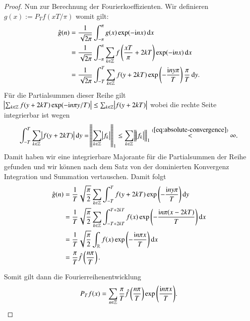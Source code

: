 \begin{proof}
  Nun zur Berechnung der Fourierkoeffizienten. Wir definieren $g(x):=P_T f(xT/\pi)$ womit gilt:
  \begin{equation*}
    \begin{split}
      \fouriertransform{g}(n)
      & =\frac{1}{\sqrt{2\pi}} \int_{-\pi}^\pi{g(x)\exp(-\i nx) \dif x} \\
      & =\frac{1}{\sqrt{2\pi}} \int_{-\pi}^\pi{\sum_{k \in \Z}{f \left( \frac{xT}{\pi} + 2kT \right)} \exp(-\i nx) \dif x} \\
      &= \frac{1}{\sqrt{2\pi}} \int_{-T}^T{\sum_{k \in \Z}{f(y + 2kT)} \exp \left( -\frac{\i ny\pi}{T} \right) \frac{\pi}{T} \dif y}.
    \end{split}
  \end{equation*}
  Für die Partialsummen dieser Reihe gilt $\abs{\sum_{k \in \mathbb{Z}}{f(y+2kT) \exp (-\mathrm{i} n\pi y/T)}} \leq \sum_{k \in \mathbb{Z}}{\abs{f(y+2kT)}}$ wobei die rechte Seite integrierbar ist wegen
  \begin{equation*}
    \int_{-T}^{T}{\sum_{k \in \Z}{\abs{f(y+2kT)}} \dif y}
    = \norm{\sum_{k \in \Z}{\abs{f_k}}}_1
    \leq \sum_{k \in \Z}{\norm{\abs{f_k}}_1}
    \stackrel{(\ref{eq:absolute-convergence})}{<} \infty.
  \end{equation*}
  Damit haben wir eine integrierbare Majorante für die Partialsummen der Reihe gefunden und wir können nach dem Satz von der dominierten Konvergenz Integration und Summation vertauschen. Damit folgt
  \begin{equation*}
    \begin{split}
      \fouriertransform{g}(n)
      &=\frac{1}{T}\sqrt{\frac{\pi}{2}} \sum_{k \in \Z}{\int_{-T}^T{f(y+2kT) \exp \left( - \frac{\i ny\pi}{T} \right) \dif y}} \\
      &=\frac{1}{T} \sqrt{\frac{\pi}{2}} \sum_{k \in \Z}{\int_{-T+2kT}^{T+2kT}{f(x)\exp \left( -\frac{\i n\pi(x-2kT)}{T} \right) \dif x}} \\
      &=\frac{1}{T} \sqrt{\frac{\pi}{2}} \int_\R{f(x) \exp \left( - \frac{\i n\pi x}{T} \right) \dif x} \\
      &= \frac{\pi}{T}\fouriertransform{f} \left( \frac{n\pi}{T} \right).
    \end{split}
  \end{equation*}

  Somit gilt dann die Fourierreihenentwicklung
  \begin{equation*}
    P_T f(x)=\sum_{n \in \mathbb{Z}}{\frac{\pi}{T} \hat{f} \left( \frac{n\pi}{T} \right) \exp \left(\frac{\mathrm{i} n\pi x}{T}\right)}.
  \end{equation*}
\end{proof}
